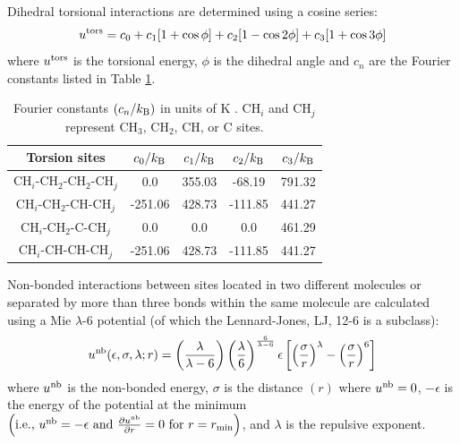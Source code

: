 \documentclass[journal=jced,manuscript=article]{achemso}
\begin{document}
    Dihedral torsional interactions are determined using a cosine series:
    \begin{equation}
    u^{\rm tors} = c_0 + c_1 [1+\cos{\phi}] + c_2 [1-\cos{2\phi}] + c_3 [1+\cos{3\phi}]
    \end{equation}
    where $u^{\rm tors}$ is the torsional energy, $\phi$ is the dihedral angle and $c_n$ are the Fourier constants listed in Table \ref{tab:torsions}.
    
    \begin{table}[h!]
    	\caption{Fourier constants $(c_n/k_{\rm B})$ in units of K \cite{Martin1999}. CH$_i$ and CH$_j$ represent CH$_3$, CH$_2$, CH, or C sites.} \label{tab:torsions}
    	\begin{center}
    		\begin{tabular}{|c|c|c|c|c|}
    			\hline
    			Torsion sites & $c_0/k_{\rm B}$ & $c_1/k_{\rm B}$ & $c_2/k_{\rm B}$ & $c_3/k_{\rm B}$ \\ \hline
    			CH$_i$-CH$_2$-CH$_2$-CH$_j$ & 0.0 & 355.03 & -68.19 & 791.32 \\ 
    			CH$_i$-CH$_2$-CH-CH$_j$ & -251.06 & 428.73 & -111.85 & 441.27 \\
    			CH$_i$-CH$_2$-C-CH$_j$ & 0.0 & 0.0 & 0.0 & 461.29 \\
    			CH$_i$-CH-CH-CH$_j$ & -251.06 & 428.73 & -111.85 & 441.27 \\
    			\hline
    		\end{tabular}
    	\end{center} 
    \end{table}
    
    Non-bonded interactions between sites located in two different molecules or separated by more than three bonds within the same molecule are calculated using a Mie $\lambda$-6 potential (of which the Lennard-Jones, LJ, 12-6 is a subclass):
    \begin{equation} \label{eq:Mie}
    u^{\rm nb}(\epsilon,\sigma,\lambda;r) = \left(\frac{\lambda}{\lambda - 6}\right)\left(\frac{\lambda}{6}\right)^{\frac{6}{\lambda - 6}} \epsilon \left[\left(\frac{\sigma}{r}\right)^{\lambda} - \left(\frac{\sigma}{r}\right)^6\right]
    \end{equation} 
    where $u^{\rm nb}$ is the non-bonded energy, $\sigma$ is the distance $(r)$ where $u^{\rm nb} = 0$, $-\epsilon$ is the energy of the potential at the minimum $\left(\text{i.e., }u^{\rm nb} = -\epsilon \text{ and } \frac{\partial u^{\rm nb}}{\partial r} = 0 \text{ for } r=r_{\rm min} \right)$, and $\lambda$ is the repulsive exponent. 
    
\end{document}
